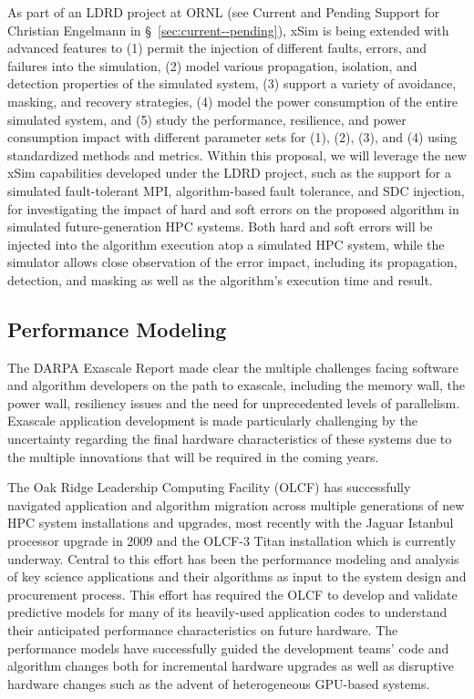 As part of an LDRD project at ORNL (see Current and Pending Support for
Christian Engelmann in \S~\ref{sec:current--pending}), xSim is being
extended with advanced features to (1) permit the injection of different
faults, errors, and failures into the simulation, (2) model various
propagation, isolation, and detection properties of the simulated system, (3)
support a variety of avoidance, masking, and recovery strategies, (4) model
the power consumption of the entire simulated system, and (5) study the
performance, resilience, and power consumption impact with different parameter
sets for (1), (2), (3), and (4) using standardized methods and metrics. Within
this proposal, we will leverage the new xSim capabilities developed under the
LDRD project, such as the support for a simulated fault-tolerant MPI,
algorithm-based fault tolerance, and SDC injection, for investigating the
impact of hard and soft errors on the proposed algorithm in simulated
future-generation HPC systems. Both hard and soft errors will be injected
into the algorithm execution atop a simulated HPC system, while the simulator
allows close observation of the error impact, including its propagation,
detection, and masking as well as the algorithm's execution time and result.


\subsection{Performance Modeling}
\label{sec:performance-modeling}

The DARPA Exascale Report \cite{darpa-exascale} made clear the multiple
challenges facing software and algorithm developers on the path to exascale,
including the memory wall, the power wall, resiliency issues and the need for
unprecedented levels of parallelism.  Exascale application development is made
particularly challenging by the uncertainty regarding the final hardware
characteristics of these systems due to the multiple innovations that will be
required in the coming years.

The Oak Ridge Leadership Computing Facility (OLCF) has successfully navigated
application and algorithm migration across multiple generations of new HPC
system installations and upgrades, most recently with the Jaguar Istanbul
processor upgrade in 2009 and the OLCF-3 Titan installation which is currently
underway.  Central to this effort has been the performance modeling and
analysis of key science applications and their algorithms as input to the
system design and procurement process.  This effort has required the OLCF to
develop and validate predictive models for many of its heavily-used
application codes to understand their anticipated performance characteristics
on future hardware.  The performance models have successfully guided the
development teams' code and algorithm changes both for incremental hardware
upgrades as well as disruptive hardware changes such as the advent of
heterogeneous GPU-based systems.

